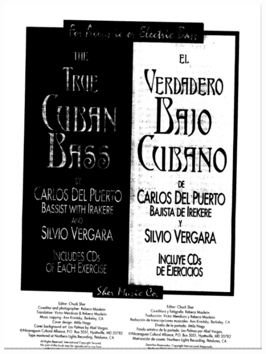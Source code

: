 \documentclass[a4paper]{book}
\begin{document}
\begin{center}
\includegraphics[width=15cm,height=20.078cm]{lebluessupportsmethodes-img175.png}
\end{center}
\end{document}

